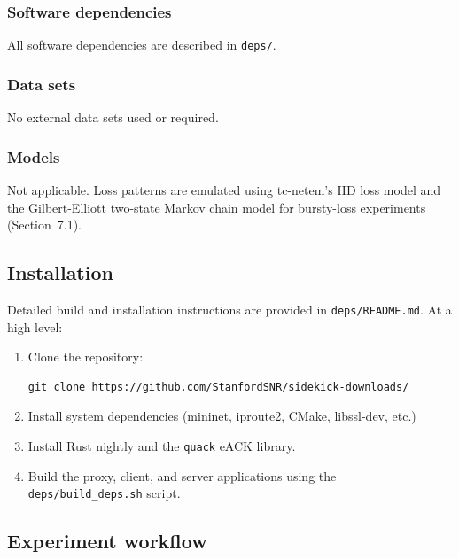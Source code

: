 \documentclass[sigplan,review]{acmart}
\begin{document}
\subsubsection{Software dependencies}

All software dependencies are described in \texttt{deps/}.

\subsubsection{Data sets}

No external data sets used or required.

\subsubsection{Models}

Not applicable. Loss patterns are emulated using tc-netem's IID loss
model and the Gilbert-Elliott two-state Markov chain model for
bursty-loss experiments (Section~7.1).

\subsection{Installation}

Detailed build and installation instructions are provided in
\texttt{deps/README.md}. At a high level:

\begin{enumerate}
  \item Clone the repository:
    \begin{verbatim}
git clone https://github.com/StanfordSNR/sidekick-downloads/
    \end{verbatim}
  \item Install system dependencies (mininet, iproute2, CMake, libssl-dev, etc.)
  \item Install Rust nightly and the \texttt{quack} eACK library.
  \item Build the proxy, client, and server applications using the \texttt{deps/build\_deps.sh} script.
\end{enumerate}

\subsection{Experiment workflow}
\end{document}
